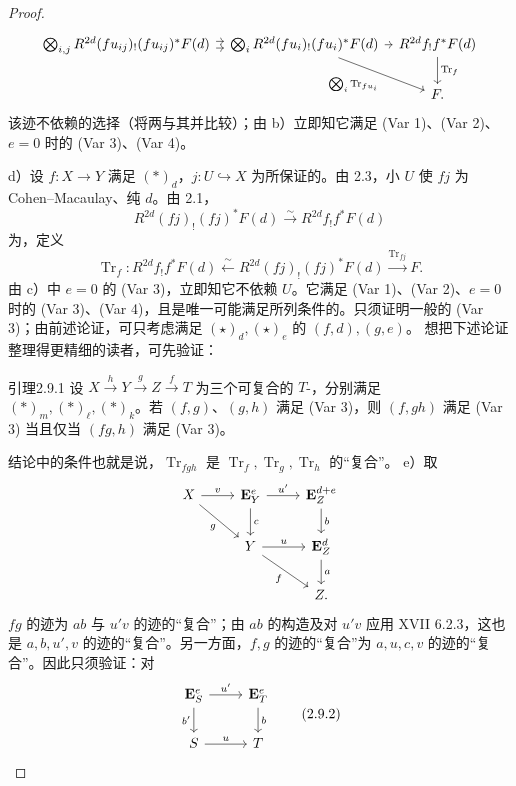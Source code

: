 \begin{proof}
\[\begin{tikzcd}[column sep=tiny]
\bigotimes_{i,j}R^{2d}(fu_{ij})_!(fu_{ij})^*F(d)\arrow[r,shift left]\arrow[r,shift right]&\bigotimes_iR^{2d}(fu_i)_!(fu_i)^*F(d)\arrow[r]\arrow[dr,"\bigotimes_i\operatorname{Tr}_{fu_i}"']&R^{2d}f_!f^*F(d)\arrow[d,"\operatorname{Tr}_f"]\\&&F.
\end{tikzcd}\]
该迹不依赖的选择（将两与其并比较）；由 b）立即知它满足 (Var 1)、(Var 2)、$e=0$ 时的 (Var 3)、(Var 4)。

d）设 $f:X\to Y$ 满足 $(*)_d$，$j:U\hookrightarrow X$ 为所保证的。由 2.3，小 $U$ 使 $fj$ 为 Cohen--Macaulay、纯 $d$。由 2.1，
\[R^{2d}(fj)_!(fj)^*F(d)\xrightarrow\sim R^{2d}f_!f^*F(d)\]
为，定义
\[\operatorname{Tr}_f:R^{2d}f_!f^*F(d)\xleftarrow\sim R^{2d}(fj)_!(fj)^*F(d)\xrightarrow{\operatorname{Tr}_{fj}}F.\]
由 c）中 $e=0$ 的 (Var 3)，立即知它不依赖 $U$。它满足 (Var 1)、(Var 2)、$e=0$ 时的 (Var 3)、(Var 4)，且是唯一可能满足所列条件的。只须证明一般的 (Var 3)；由前述论证，可只考虑满足 $(\star)_d,(\star)_e$ 的 $(f,d),(g,e)$。
想把下述论证整理得更精细的读者，可先验证：
\begin{SGAresult}{引理}{2.9.1}
设 $X\xrightarrow hY\xrightarrow gZ\xrightarrow fT$ 为三个可复合的 $T$-，分别满足 $(*)_m,(*)_\ell,(*)_k$。若 $(f,g)$、$(g,h)$ 满足 (Var 3)，则 $(f,gh)$ 满足 (Var 3) 当且仅当 $(fg,h)$ 满足 (Var 3)。
\end{SGAresult}
结论中的条件也就是说，$\operatorname{Tr}_{fgh}$ 是 $\operatorname{Tr}_f,\operatorname{Tr}_g,\operatorname{Tr}_h$ 的“复合”。
e）取
\[\begin{tikzcd}X\arrow[r,"v"]\arrow[dr,"g"']&\mathbf E^e_Y\arrow[r,"u'"]\arrow[d,"c"]&\mathbf E^{d+e}_Z\arrow[d,"b"]\\&Y\arrow[r,"u"]\arrow[dr,"f"']&\mathbf E^d_Z\arrow[d,"a"]\\&&Z.
\end{tikzcd}\]
$fg$ 的迹为 $ab$ 与 $u'v$ 的迹的“复合”；由 $ab$ 的构造及对 $u'v$ 应用 XVII 6.2.3，这也是 $a,b,u',v$ 的迹的“复合”。另一方面，$f,g$ 的迹的“复合”为 $a,u,c,v$ 的迹的“复合”。因此只须验证：对
\[\begin{tikzcd}\mathbf E^e_S\arrow[r,"u'"]\arrow[d,"b'"']&\mathbf E^e_T\arrow[d,"b"]\\S\arrow[r,"u"]&T\end{tikzcd}\tag{2.9.2}\]

\end{proof}
